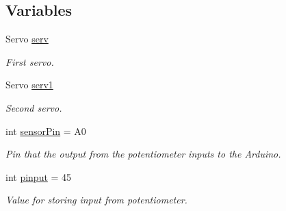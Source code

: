 \subsection*{Variables}
\begin{DoxyCompactItemize}
\item 
\hypertarget{_working___potentiometer___code_8ino_a9488c8d7a3c4603f10af1b9985a0fedf}{Servo \hyperlink{_working___potentiometer___code_8ino_a9488c8d7a3c4603f10af1b9985a0fedf}{serv}}\label{_working___potentiometer___code_8ino_a9488c8d7a3c4603f10af1b9985a0fedf}

\begin{DoxyCompactList}\small\item\em First servo. \end{DoxyCompactList}\item 
\hypertarget{_working___potentiometer___code_8ino_a9a8595d64e62e1500b064abd7e588749}{Servo \hyperlink{_working___potentiometer___code_8ino_a9a8595d64e62e1500b064abd7e588749}{serv1}}\label{_working___potentiometer___code_8ino_a9a8595d64e62e1500b064abd7e588749}

\begin{DoxyCompactList}\small\item\em Second servo. \end{DoxyCompactList}\item 
\hypertarget{_working___potentiometer___code_8ino_a632532ec80ad52b56985be11fe130d01}{int \hyperlink{_working___potentiometer___code_8ino_a632532ec80ad52b56985be11fe130d01}{sensor\-Pin} = A0}\label{_working___potentiometer___code_8ino_a632532ec80ad52b56985be11fe130d01}

\begin{DoxyCompactList}\small\item\em Pin that the output from the potentiometer inputs to the Arduino. \end{DoxyCompactList}\item 
\hypertarget{_working___potentiometer___code_8ino_a950e924f3fc8a60ba1044df9cf3cc186}{int \hyperlink{_working___potentiometer___code_8ino_a950e924f3fc8a60ba1044df9cf3cc186}{pinput} = 45}\label{_working___potentiometer___code_8ino_a950e924f3fc8a60ba1044df9cf3cc186}

\begin{DoxyCompactList}\small\item\em Value for storing input from potentiometer. \end{DoxyCompactList}\end{DoxyCompactItemize}


